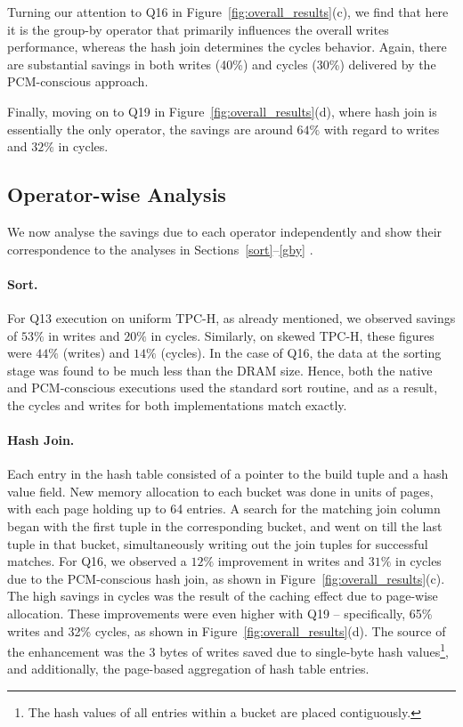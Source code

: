 Turning our attention to Q16 in Figure~\ref{fig:overall_results}(c),
we find that here it is the group-by operator that primarily influences
the overall writes performance, whereas the hash join determines the
cycles behavior. Again, there are substantial savings in both writes
(40\%) and  cycles (30\%) delivered by the PCM-conscious approach.

Finally, moving on to Q19 in Figure~\ref{fig:overall_results}(d),
where hash join is essentially the only operator, the
savings are around $64\%$ with regard to writes and $32\%$ in cycles.

\subsection{Operator-wise Analysis}
We now analyse the savings due to each operator independently and show
their correspondence to the analyses in Sections~\ref{sort}--\ref{gby} .

\paragraph{Sort.}
For Q13 execution on uniform TPC-H, as already mentioned, we observed 
savings of $53\%$ in writes and $20\%$ in cycles. Similarly, on skewed TPC-H, these  
figures were $44\%$ (writes) and $14\%$ (cycles). 
In the case of Q16, the data at the sorting stage was
found to be much less than the DRAM size. Hence, both the native and
PCM-conscious executions used the standard sort routine, and as a result,
the cycles and writes for both implementations match exactly.

\paragraph{Hash Join.}
Each entry in the hash table consisted of a pointer to the build tuple
and a hash value field. New memory allocation to each bucket was done
in units of pages, with each page holding up to 64 entries. A search for
the matching join column began with the first tuple in the corresponding
bucket, and went on till the last tuple in that bucket, simultaneously
writing out the join tuples for successful matches.  For Q16, we
observed a $12\%$ improvement in writes and $31\%$ in cycles due to the
PCM-conscious hash join, as shown in Figure~\ref{fig:overall_results}(c). The
high savings in cycles was the result of the caching effect due to page-wise
allocation.
These improvements were even higher with Q19  -- specifically, 65\% writes and 32\%
cycles, as shown in Figure~\ref{fig:overall_results}(d). The source of the
enhancement was the 3 bytes of writes saved due to single-byte hash
values\footnote{The hash values of all entries within a bucket are placed
contiguously.}, and additionally, the page-based aggregation of hash table
entries.


